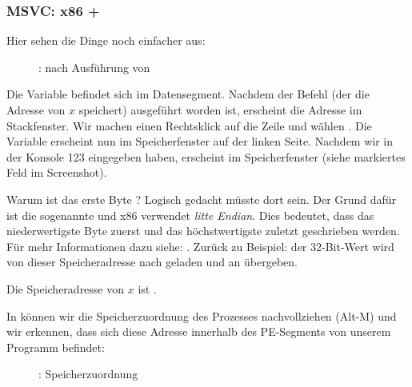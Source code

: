 \clearpage
\subsubsection{MSVC: x86 + \olly}
\myindex{\olly}

Hier sehen die Dinge noch einfacher aus:

\begin{figure}[H]
\centering
{}
\caption{\olly: nach Ausführung von \scanf}
\label{fig:scanf_ex2_olly_1}
\end{figure}

Die Variable befindet sich im Datensegment.
Nachdem der \PUSH Befehl (der die Adresse von $x$ speichert) ausgeführt worden ist,
erscheint die Adresse im Stackfenster. Wir machen einen Rechtsklick auf die Zeile und wählen .
Die Variable erscheint nun im Speicherfenster auf der linken Seite. 
Nachdem wir in der Konsole 123 eingegeben haben, erscheint  im Speicherfenster (siehe markiertes Feld im
Screenshot).

Warum ist das erste Byte ?
Logisch gedacht müsste dort  sein. 
Der Grund dafür ist die sogenannte  und x86 verwendet \emph{litte Endian}. 
Dies bedeutet, dass das niederwertigste Byte zuerst und das höchstwertigste zuletzt geschrieben werden.
Für mehr Informationen dazu siehe: .
Zurück zu Beispiel: der 32-Bit-Wert wird von dieser Speicheradresse nach \EAX geladen und an \printf übergeben. 

Die Speicheradresse von $x$ ist .

\clearpage
In \olly können wir die Speicherzuordnung des Prozesses nachvollziehen (Alt-M) und wir erkennen, dass sich diese Adresse
innerhalb des  PE-Segments von unserem Programm befindet:

\label{olly_memory_map_example}
\begin{figure}[H]
\centering
{}
\caption{\olly: Speicherzuordnung}
\label{fig:scanf_ex2_olly_2}
\end{figure}

